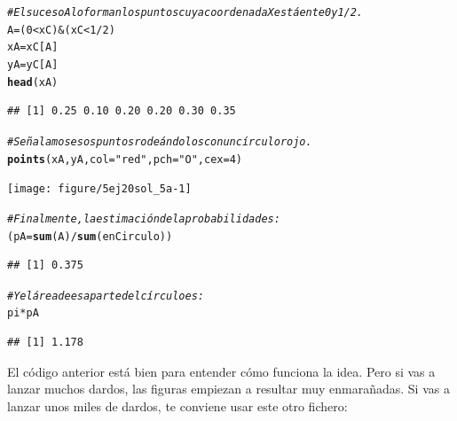 \documentclass[10pt,a4paper]{article}\usepackage[]{graphicx}\usepackage[]{color}
\makeatletter
\newcommand{\hlnum}[1]{\textcolor[rgb]{0.686,0.059,0.569}{#1}}%
\newcommand{\hlstr}[1]{\textcolor[rgb]{0.192,0.494,0.8}{#1}}%
\newcommand{\hlcom}[1]{\textcolor[rgb]{0.678,0.584,0.686}{\textit{#1}}}%
\newcommand{\hlopt}[1]{\textcolor[rgb]{0,0,0}{#1}}%
\newcommand{\hlstd}[1]{\textcolor[rgb]{0.345,0.345,0.345}{#1}}%
\newcommand{\hlkwb}[1]{\textcolor[rgb]{0.69,0.353,0.396}{#1}}%
\newcommand{\hlkwc}[1]{\textcolor[rgb]{0.333,0.667,0.333}{#1}}%
\newcommand{\hlkwd}[1]{\textcolor[rgb]{0.737,0.353,0.396}{\textbf{#1}}}%
\newenvironment{kframe}{%
 \def\at@end@of@kframe{}%
 \ifinner\ifhmode%
  \def\at@end@of@kframe{\end{minipage}}%
  \begin{minipage}{\columnwidth}%
 \fi\fi%
 \def\FrameCommand##1{\hskip\@totalleftmargin \hskip-\fboxsep
 \colorbox{shadecolor}{##1}\hskip-\fboxsep
     \hskip-\linewidth \hskip-\@totalleftmargin \hskip\columnwidth}%
 \MakeFramed {\advance\hsize-\width
   \@totalleftmargin\z@ \linewidth\hsize
   \@setminipage}}%
 {\par\unskip\endMakeFramed%
 \at@end@of@kframe}
\newenvironment{knitrout}{}{} %
\makeatother
\begin{document}
\begin{enumerate}
\begin{knitrout}
\begin{kframe}
\begin{alltt}
\hlcom{# El suceso A lo forman los puntos cuya coordenada X está ente 0 y 1/2.}
\hlstd{A} \hlkwb{=} \hlstd{(}\hlnum{0} \hlopt{<} \hlstd{xC)} \hlopt{&} \hlstd{(xC} \hlopt{<} \hlnum{1}\hlopt{/}\hlnum{2}\hlstd{)}
\hlstd{xA} \hlkwb{=}\hlstd{xC[A]}
\hlstd{yA} \hlkwb{=}\hlstd{yC[A]}
\hlkwd{head}\hlstd{(xA)}
\end{alltt}
\begin{verbatim}
## [1] 0.25 0.10 0.20 0.20 0.30 0.35
\end{verbatim}
\begin{alltt}
\hlcom{# Señalamos esos puntos rodeándolos con un círculo rojo.}
\hlkwd{points}\hlstd{(xA, yA,} \hlkwc{col}\hlstd{=}\hlstr{"red"}\hlstd{,} \hlkwc{pch}\hlstd{=}\hlstr{"O"}\hlstd{,} \hlkwc{cex}\hlstd{=}\hlnum{4}\hlstd{)}
\end{alltt}
\end{kframe}
\texttt{[image: figure/5ej20sol\_5a-1]} 
\begin{kframe}\begin{alltt}
\hlcom{# Finalmente, la estimación de la probabilidad es:}
\hlstd{(pA} \hlkwb{=} \hlkwd{sum}\hlstd{(A)} \hlopt{/} \hlkwd{sum}\hlstd{(enCirculo))}
\end{alltt}
\begin{verbatim}
## [1] 0.375
\end{verbatim}
\begin{alltt}
\hlcom{# Y el área de esa parte del círculo es:}
\hlstd{pi} \hlopt{*} \hlstd{pA}
\end{alltt}
\begin{verbatim}
## [1] 1.178
\end{verbatim}
\end{kframe}
\end{knitrout}
  El código anterior está bien para entender cómo funciona la idea. Pero si vas a lanzar muchos dardos, las figuras empiezan a resultar muy enmarañadas. Si vas a lanzar unos miles de dardos, te conviene usar este otro fichero:
  \begin{center}
  \end{center}


\end{enumerate}
\end{document}
